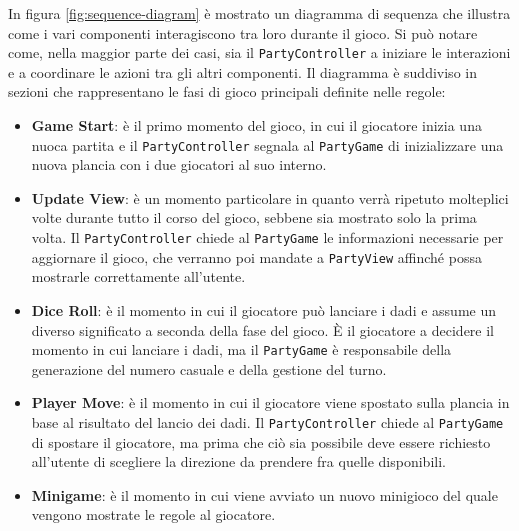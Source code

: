 In figura \ref{fig:sequence-diagram} è mostrato un diagramma di sequenza che illustra
come i vari componenti interagiscono tra loro durante il gioco. Si può notare come, 
nella maggior parte dei casi, sia il \texttt{PartyController} a iniziare le interazioni
e a coordinare le azioni tra gli altri componenti. Il diagramma è suddiviso in sezioni
che rappresentano le fasi di gioco principali definite nelle regole:
\begin{itemize}
    \item \textbf{Game Start}: è il primo momento del gioco, in cui il giocatore inizia
    una nuoca partita e il \texttt{PartyController} segnala al \texttt{PartyGame} di 
    inizializzare una nuova plancia con i due giocatori al suo interno.
    \item \textbf{Update View}: è un momento particolare in quanto verrà ripetuto molteplici
    volte durante tutto il corso del gioco, sebbene sia mostrato solo la prima volta.
    Il \texttt{PartyController} chiede al \texttt{PartyGame} le informazioni necessarie
    per aggiornare il gioco, che verranno poi mandate a \texttt{PartyView} affinché possa
    mostrarle correttamente all'utente.
    \item \textbf{Dice Roll}: è il momento in cui il giocatore può lanciare i dadi e assume
    un diverso significato a seconda della fase del gioco. È il giocatore a decidere il 
    momento in cui lanciare i dadi, ma il \texttt{PartyGame} è responsabile della generazione
    del numero casuale e della gestione del turno.
    \item \textbf{Player Move}: è il momento in cui il giocatore viene spostato sulla
    plancia in base al risultato del lancio dei dadi. Il \texttt{PartyController} chiede
    al \texttt{PartyGame} di spostare il giocatore, ma prima che ciò sia possibile 
    deve essere richiesto all'utente di scegliere la direzione da prendere fra quelle 
    disponibili. 
    \item \textbf{Minigame}: è il momento in cui viene avviato un nuovo minigioco del quale
    vengono mostrate le regole al giocatore.
\end{itemize}

